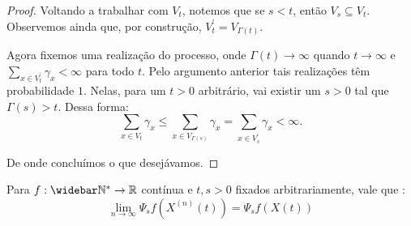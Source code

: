 \begin{proof}
  Voltando a trabalhar com $V_t$, notemos que se $s < t$, então $V_s
  \subseteq V_t$. Observemos ainda que, por construção, $V^\prime_t =
  V_{\Gamma(t)}$.

  Agora fixemos uma realização do processo, onde $\Gamma(t) \to
  \infty$ quando $t \to \infty$ e $\sum_{x \in V^\prime_t} \gamma_x <
  \infty$ para todo $t$. Pelo argumento anterior tais realizações têm
  probabilidade $1$. Nelas, para um $t > 0$ arbitrário, vai existir
  um $s > 0$ tal que $\Gamma(s) > t$. Dessa forma:
  \begin{displaymath}
    \sum_{x \in V_t} \gamma_x \leq \sum_{x \in V_{\Gamma(s)}}
    \gamma_x =
    \sum_{x \in V^\prime_s} \gamma_x < \infty.
  \end{displaymath}

  De onde concluímos o que desejávamos.
\end{proof}


\begin{proposicao}
  \label{prop:semigrupo-quase-continuo}
  Para $f: \Nzb \to \R$ contínua e $t, s > 0$ fixados arbitrariamente,
  vale que \qc:
  \begin{equation}
    \label{eq:semigrupo-quase-continuo}
    \lim_{n \to \infty} \Psi_s f (X^{(n)}(t)) = \Psi_s f(X(t))
  \end{equation}
\end{proposicao}

